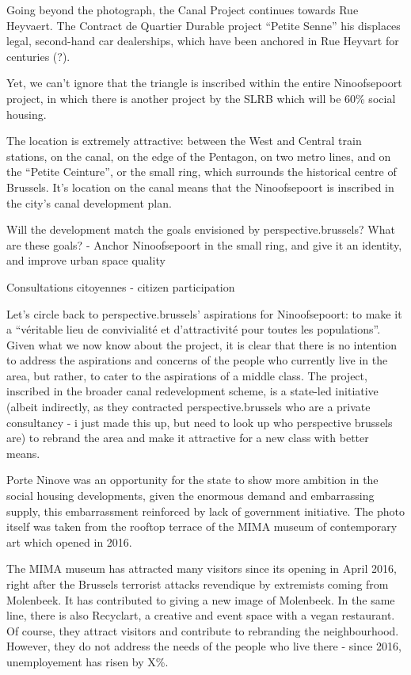 \documentclass{article}[11pt]
\begin{document}
Going beyond the photograph, the Canal Project continues towards Rue Heyvaert. The Contract de Quartier Durable project ``Petite Senne'' his displaces legal, second-hand car dealerships, which have been anchored in Rue Heyvart for centuries (?). 

Yet, we can't ignore that the triangle is inscribed within the entire Ninoofsepoort project, in which there is another project by the SLRB which will be 60\% social housing.

The location is extremely attractive: between the West and Central train stations, on the canal, on the edge of the Pentagon, on two metro lines, and on the ``Petite Ceinture'', or the small ring, which surrounds the historical centre of Brussels. It's location on the canal means that the Ninoofsepoort is inscribed in the city's canal development plan.

Will the development match the goals envisioned by perspective.brussels?
What are these goals?
	- Anchor Ninoofsepoort in the small ring, and give it an identity, and improve urban space quality

Consultations citoyennes - citizen participation

Let's circle back to perspective.brussels' aspirations for Ninoofsepoort: to make it a ``véritable lieu de convivialité et d’attractivité pour toutes les populations''. Given what we now know about the project, it is clear that there is no intention to address the aspirations and concerns of the people who currently live in the area, but rather, to cater to the aspirations of a middle class.
The project, inscribed in the broader canal redevelopment scheme, is a state-led initiative (albeit indirectly, as they contracted perspective.brussels who are a private consultancy - i just made this up, but need to look up who perspective brussels are) to rebrand the area and make it attractive for a new class with better means. 


Porte Ninove was an opportunity for the state to show more ambition in the social housing developments, given the enormous demand and embarrassing supply, this embarrassment reinforced by lack of government initiative.
The photo itself was taken from the rooftop terrace of the MIMA museum of contemporary art which opened in 2016.

The MIMA museum has attracted many visitors since its opening in April 2016, right after the Brussels terrorist attacks revendique by extremists coming from Molenbeek. It has contributed to giving a new image of Molenbeek. In the same line, there is also Recyclart, a creative and event space with a vegan restaurant. Of course, they attract visitors and contribute to rebranding the neighbourhood. However, they do not address the needs of the people who live there - since 2016, unemployement has risen by X\%.
\end{document}
